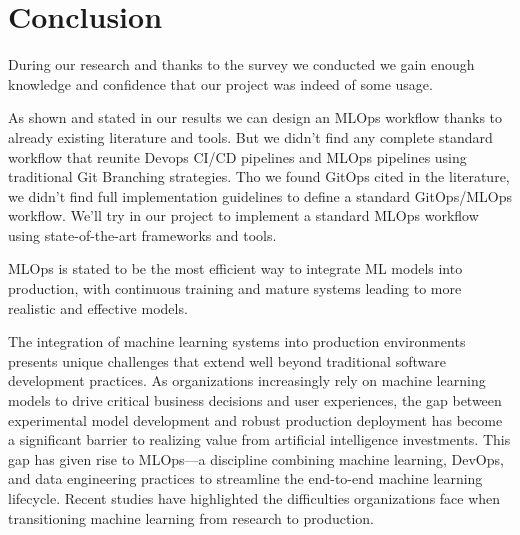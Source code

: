 \section{Conclusion}\label{sec:stconclusion}

During our research and thanks to the survey we conducted we gain enough knowledge and confidence that our project was indeed of some usage.

As shown and stated in our results we can design an MLOps workflow thanks to already existing literature and tools.
But we didn't find any complete standard workflow that reunite Devops CI/CD pipelines and MLOps pipelines using traditional Git Branching strategies.
Tho we found GitOps cited in the literature, we didn't find full implementation guidelines to define a standard GitOps/MLOps workflow.
We'll try in our project to implement a standard MLOps workflow using state-of-the-art frameworks and tools.

MLOps is stated to be the most efficient way to integrate ML models into production, with continuous training and mature systems leading to more realistic and effective models.\cite{inproceedings}

The integration of machine learning systems into production environments presents unique challenges that extend well beyond traditional software development practices.
As organizations increasingly rely on machine learning models to drive critical business decisions and user experiences,
the gap between experimental model development and robust production deployment has become a significant barrier to realizing value from artificial intelligence investments\cite{Haakman2021}.
This gap has given rise to MLOps—a discipline combining machine learning, DevOps, and data engineering practices to streamline the end-to-end machine learning lifecycle\cite{Kreuzberger2022MachineLO}.
Recent studies have highlighted the difficulties organizations face when transitioning machine learning from research to production.
